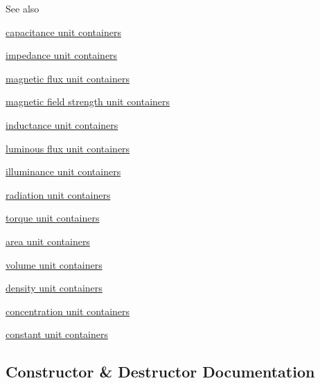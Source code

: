 \begin{DoxySeeAlso}{See also}
\begin{DoxyItemize}
\item \hyperlink{namespaceunits_1_1capacitance_capacitanceContainers}{capacitance unit containers}
\item \hyperlink{namespaceunits_1_1impedance_impedanceContainers}{impedance unit containers}
\item \hyperlink{namespaceunits_1_1magnetic__flux_magneticFluxContainers}{magnetic flux unit containers}
\item \hyperlink{namespaceunits_1_1magnetic__field__strength_magneticFieldStrengthContainers}{magnetic field strength unit containers}
\item \hyperlink{namespaceunits_1_1inductance_inductanceContainers}{inductance unit containers}
\item \hyperlink{namespaceunits_1_1luminous__flux_luminousFluxContainers}{luminous flux unit containers}
\item \hyperlink{namespaceunits_1_1illuminance_illuminanceContainers}{illuminance unit containers}
\item \hyperlink{namespaceunits_1_1radiation_radiationContainers}{radiation unit containers}
\item \hyperlink{namespaceunits_1_1torque_torqueContainers}{torque unit containers}
\item \hyperlink{namespaceunits_1_1area_areaContainers}{area unit containers}
\item \hyperlink{namespaceunits_1_1volume_volumeContainers}{volume unit containers}
\item \hyperlink{namespaceunits_1_1density_densityContainers}{density unit containers}
\item \hyperlink{namespaceunits_1_1concentration_concentrationContainers}{concentration unit containers}
\item \hyperlink{namespaceunits_1_1constants_constantContainers}{constant unit containers} 
\end{DoxyItemize}
\end{DoxySeeAlso}


\subsection{Constructor \& Destructor Documentation}
\hypertarget{classunits_1_1unit__t_a8a3086127b2fe7ae7f837e1c09ddcd5d}{}
